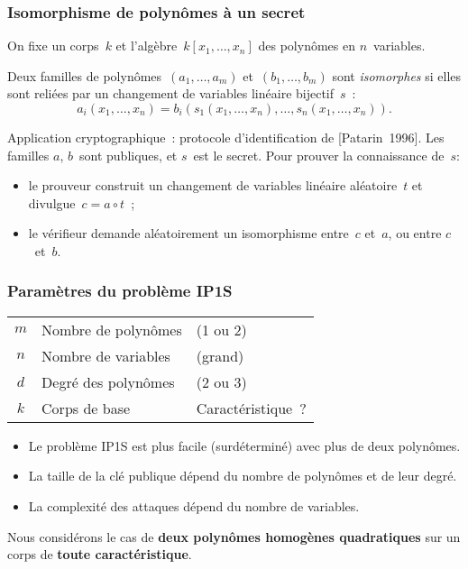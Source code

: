\documentclass{beamer}%
\def\strong#1{{\bf\color{rouge}#1}}
\def\emphz#1{\emph{{\color{bleu}#1}}}
\begin{document}
\begin{frame}
\titlepage
\end{frame}%
\begin{frame}\frametitle{Isomorphisme de polynômes à un secret}%
On fixe un corps~$k$ et l'algèbre~$k[x_1,…,x_n]$ des polynômes en
$n$~variables.

\begin{definition}
Deux familles de polynômes~$(a_1,…, a_m)$ et~$(b_1, …, b_m)$ sont
\emphz{isomorphes} si elles sont reliées par un changement de variables
linéaire bijectif~$s$ :
\[ a_i (x_1, …, x_n) = b_i (s_1 (x_1, …, x_n), …, s_n (x_1, …, x_n)). \]
\end{definition}

Application cryptographique : protocole d'identification de
[Patarin~1996]. Les familles $a$, $b$~sont publiques, et $s$~est le
secret. Pour prouver la connaissance de~$s$:
\begin{itemize}
\item le prouveur construit un changement de variables linéaire
aléatoire~$t$ et divulgue~$c = a ∘ t$ ;
\item le vérifieur demande aléatoirement un isomorphisme entre~$c$
et~$a$, ou entre $c$~et~$b$.
\end{itemize}
\end{frame}%
\begin{frame}\frametitle{Paramètres du problème IP1S}%

\hfil\hfil\begin{tabular}{cll}\toprule
\color{rouge} $m$ & Nombre de polynômes & (1 ou 2)\\
\color{rouge} $n$ & Nombre de variables & (grand) \\
\color{rouge} $d$ & Degré des polynômes & (2 ou 3) \\
\color{rouge} $k$ & Corps de base & Caractéristique ?\\
\bottomrule\end{tabular}

\bigskip
\begin{itemize}
\item Le problème IP1S est {plus facile} (surdéterminé) avec plus
de deux polynômes.
\item La taille de la clé publique dépend du nombre de polynômes et de
leur degré.
\item La complexité des attaques dépend du nombre de variables.
\end{itemize}

\bigskip
Nous considérons le cas de \strong{deux polynômes homogènes quadratiques}
sur un corps de \strong{toute caractéristique}.
\end{frame}%
\end{document}

